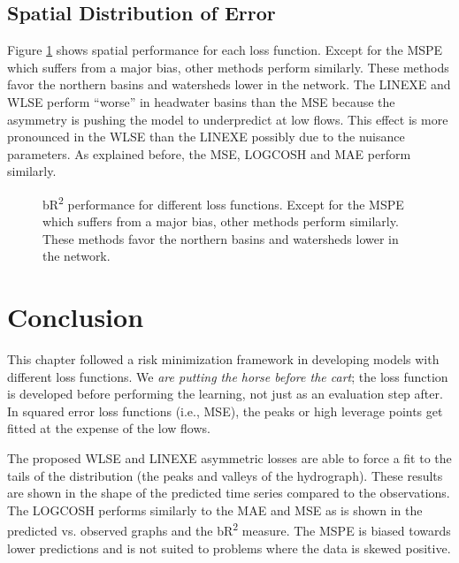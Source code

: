 \subsection{Spatial Distribution of Error}
Figure \ref{fig:br2map} shows spatial performance for each loss function. Except for the MSPE which suffers from a major bias, other methods perform similarly. These methods favor the northern basins and watersheds lower in the network. The LINEXE and WLSE perform ``worse'' in headwater basins than the MSE because the asymmetry is pushing the model to underpredict at low flows. This effect is more pronounced in the WLSE than the LINEXE possibly due to the nuisance parameters. As explained before, the MSE, LOGCOSH and MAE perform similarly. 

\begin{figure}
	\centering
	\begin{frame}{}
	\end{frame}
	\caption[bR\textsuperscript{2} performance for different loss functions.]{bR\textsuperscript{2} performance for different loss functions. Except for the MSPE which suffers from a major bias, other methods perform similarly. These methods favor the northern basins and watersheds lower in the network.}
	\label{fig:br2map}
\end{figure}

\section{Conclusion} \label{ch4: conclusion}
This chapter followed a risk minimization framework in developing models with different loss functions. We \textit{are putting the horse before the cart}; the loss function is developed before performing the learning, not just as an evaluation step after. In squared error loss functions (i.e., MSE), the peaks or high leverage points get fitted at the expense of the low flows. 

The proposed WLSE and LINEXE asymmetric losses are able to force a fit to the tails of the distribution (the peaks and valleys of the hydrograph). These results are shown in the shape of the predicted time series compared to the observations. The LOGCOSH performs similarly to the MAE and MSE as is shown in the predicted vs. observed graphs and the bR\textsuperscript{2} measure. The MSPE is biased towards lower predictions and is not suited to problems where the data is skewed positive. 

